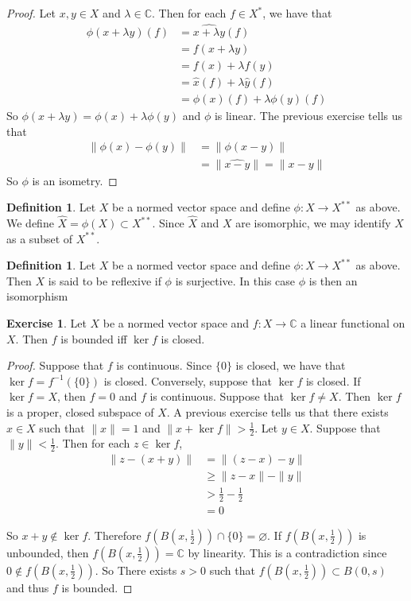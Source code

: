 \documentclass[12pt]{amsart}
\theoremstyle{definition}
\newtheorem{defn}[definition]{Definition}
\newtheorem{ex}[definition]{Exercise}
\newcommand{\lam}{\lambda}
\newcommand{\C}{\mathbb{C}}
\newcommand{\lex}[1]{\label{ex:#1}}
\newcommand{\ld}[1]{\label{defn:#1}}
\begin{document}
	\begin{proof}
		Let $x,y \in X$ and $\lam \in \C$. Then for each $f \in X^*$, we have that 
		\begin{align*}
			\phi(x+ \lam y)(f) 
			&= \widehat{x+ \lam y}(f) \\
			&= f(x+\lam y) \\
			&= f(x) + \lam f(y) \\
			&= \hat{x}(f) + \lam \hat{y}(f)\\
			&= \phi(x)(f) + \lam \phi(y)(f)
		\end{align*} 
		So $\phi(x+ \lam y) = \phi(x) + \lam \phi(y)$ and $\phi$ is linear. The previous exercise tells us that 
		\begin{align*}
			\|\phi(x) - \phi(y) \|
			&= \|\phi(x-y)\|\\
			&= \|\widehat{x-y} \|= \|x-y \|
		\end{align*}
		So $\phi$ is an isometry.
	\end{proof}
	
	\begin{defn} \ld{}
		Let $X$ be a normed vector space and define $\phi:X \rightarrow X^{**}$ as above. We define $\widehat{X} = \phi(X) \subset X^{**}$. Since $\widehat{X}$ and $X$ are isomorphic, we may identify $X$ as a subset of $X^{**}$. 
	\end{defn}
	
	\begin{defn} \ld{}
		Let $X$ be a normed vector space and define $\phi:X \rightarrow X^{**}$ as above. Then $X$ is said to be reflexive if $\phi$ is surjective. In this case $\phi$ is then an isomorphism
	\end{defn}
	
	\begin{ex} \lex{}
		Let $X$ be a normed vector space and $f:X \rightarrow \C$ a linear functional on $X$. Then $f$ is bounded iff $\ker f$ is closed. 
	\end{ex}
	
	\begin{proof}
		Suppose that $f$ is continuous. Since $\{0\}$ is closed, we have that $\ker f = f^{-1}(\{0\})$ is closed. Conversely, suppose that $\ker f$ is closed. If $\ker f = X$, then $f =0$ and $f$ is continuous. Suppose that $\ker f \neq X$. Then $\ker f$ is a proper, closed subspace of $X$. A previous exercise tells us that there exists $x \in X$ such that $\|x \|= 1$ and $\|x + \ker f \|> \frac{1}{2}$. Let $y \in X$. Suppose that $\|y \|< \frac{1}{2}$. Then for each $z \in \ker f$, 
		\begin{align*}
			\|z -  (x+y)\|
			& = \|(z-x) -y \|\\
			& \geq \|z-x \|- \|y \|\\
			& > \frac{1}{2} - \frac{1}{2} \\
			&=0
		\end{align*}
		
		So $x+y \not \in \ker f$. Therefore $f(B(x,\frac{1}{2})) \cap \{0\} = \varnothing$. If $f(B(x,\frac{1}{2})) $ is unbounded, then $f(B(x,\frac{1}{2})) = \C$ by linearity. This is a contradiction since $0 \not \in f(B(x,\frac{1}{2}))$. So There exists $s > 0$ such that $f(B(x,\frac{1}{2})) \subset B(0,s)$ and thus $f$ is bounded. 
	\end{proof}
	
\end{document}
